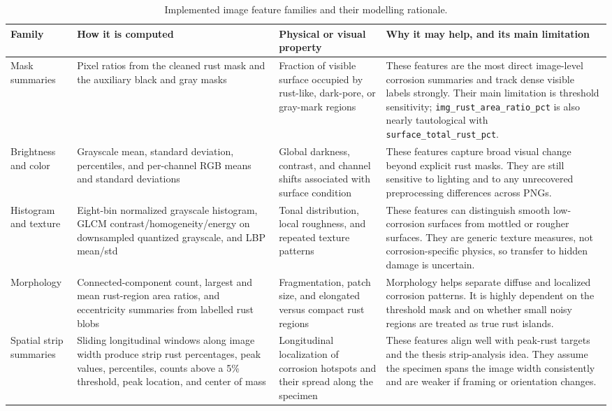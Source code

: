 \documentclass[10pt,a4paper,twocolumn]{article}
\begin{document}
\begin{table}[t]
\centering
\caption{Implemented image feature families and their modelling rationale.}
\label{tab:feature-families}
\scriptsize
\begin{tabularx}{\textwidth}{L{0.12\textwidth}L{0.28\textwidth}L{0.18\textwidth}Y}
\toprule
\textbf{Family} & \textbf{How it is computed} & \textbf{Physical or visual property} & \textbf{Why it may help, and its main limitation} \\
\midrule
Mask summaries & Pixel ratios from the cleaned rust mask and the auxiliary black and gray masks & Fraction of visible surface occupied by rust-like, dark-pore, or gray-mark regions & These features are the most direct image-level corrosion summaries and track dense visible labels strongly. Their main limitation is threshold sensitivity; \texttt{img\_rust\_area\_ratio\_pct} is also nearly tautological with \texttt{surface\_total\_rust\_pct}. \\
Brightness and color & Grayscale mean, standard deviation, percentiles, and per-channel RGB means and standard deviations & Global darkness, contrast, and channel shifts associated with surface condition & These features capture broad visual change beyond explicit rust masks. They are still sensitive to lighting and to any unrecovered preprocessing differences across PNGs. \\
Histogram and texture & Eight-bin normalized grayscale histogram, GLCM contrast/homogeneity/energy on downsampled quantized grayscale, and LBP mean/std & Tonal distribution, local roughness, and repeated texture patterns & These features can distinguish smooth low-corrosion surfaces from mottled or rougher surfaces. They are generic texture measures, not corrosion-specific physics, so transfer to hidden damage is uncertain. \\
Morphology & Connected-component count, largest and mean rust-region area ratios, and eccentricity summaries from labelled rust blobs & Fragmentation, patch size, and elongated versus compact rust regions & Morphology helps separate diffuse and localized corrosion patterns. It is highly dependent on the threshold mask and on whether small noisy regions are treated as true rust islands. \\
Spatial strip summaries & Sliding longitudinal windows along image width produce strip rust percentages, peak values, percentiles, counts above a 5\% threshold, peak location, and center of mass & Longitudinal localization of corrosion hotspots and their spread along the specimen & These features align well with peak-rust targets and the thesis strip-analysis idea. They assume the specimen spans the image width consistently and are weaker if framing or orientation changes. \\
\bottomrule
\end{tabularx}
\end{table}
\end{document}
